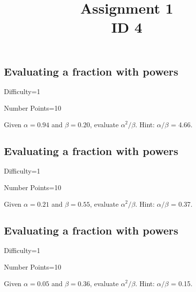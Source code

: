\documentclass{article}
\title{Assignment 1 \\ ID 4}
\begin{document}
\maketitle

\section{} 



\subsection{Evaluating a fraction with powers}

Difficulty=1

Number Points=10

Given $\alpha = 0.94$ and $\beta = 0.20$, evaluate $\alpha^{2}/\beta$. Hint: $\alpha/\beta$ = 4.66.

\subsection{Evaluating a fraction with powers}

Difficulty=1

Number Points=10

Given $\alpha = 0.21$ and $\beta = 0.55$, evaluate $\alpha^{2}/\beta$. Hint: $\alpha/\beta$ = 0.37.

\subsection{Evaluating a fraction with powers}

Difficulty=1

Number Points=10

Given $\alpha = 0.05$ and $\beta = 0.36$, evaluate $\alpha^{2}/\beta$. Hint: $\alpha/\beta$ = 0.15.
\end{document}
